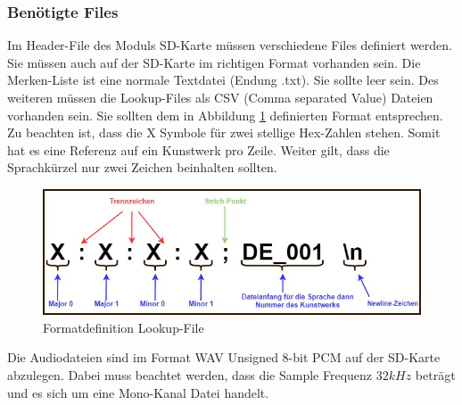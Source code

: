 \subsubsection{Benötigte Files}
Im Header-File des Moduls SD-Karte müssen verschiedene Files definiert werden. Sie müssen auch auf der SD-Karte im richtigen Format vorhanden sein. Die Merken-Liste ist eine normale Textdatei (Endung .txt). Sie sollte leer sein. Des weiteren müssen die Lookup-Files als CSV (Comma separated Value) Dateien vorhanden sein. Sie sollten dem in Abbildung \ref{fig:definition_lookup_file} definierten Format entsprechen. Zu beachten ist, dass die X Symbole für zwei stellige Hex-Zahlen stehen. Somit hat es eine Referenz auf ein Kunstwerk pro Zeile. Weiter gilt, dass die Sprachkürzel nur zwei Zeichen beinhalten sollten.

\begin{figure}[H]
	\begin{center}
		\includegraphics[width=140mm]{data/Definition_file.jpg}
		\caption[Formatdefinition Lookup-File]{Formatdefinition Lookup-File} %
		\label{fig:definition_lookup_file}
	\end{center}
\end{figure}

Die Audiodateien sind im Format WAV Unsigned 8-bit PCM auf der SD-Karte abzulegen. Dabei muss beachtet werden, dass die Sample Frequenz $32 kHz$ beträgt und es sich um eine Mono-Kanal Datei handelt.
